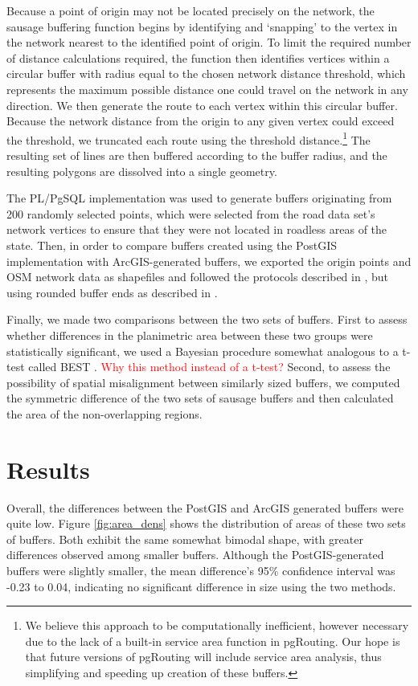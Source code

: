 \documentclass[11pt,letterpaper]{article} %
\begin{document}
Because a point of origin may not be located precisely on the network,
the sausage buffering function begins by identifying and `snapping' to the
vertex in the network nearest to the identified point of origin. To limit the
required number of distance calculations required, the function then
identifies vertices within a circular buffer with radius equal to the
chosen network distance threshold, which represents the maximum
possible distance one could travel on the network in any
direction. We then generate the route to each vertex within this
circular buffer. Because the network distance from the origin to any given vertex could exceed the threshold, we truncated each route using the threshold distance.\footnote{We
  believe this approach to be computationally inefficient, however
  necessary due to the lack of a built-in service area function in
  pgRouting. Our hope is that future versions of pgRouting will
  include service area analysis, thus simplifying and speeding up
  creation of these buffers.} The resulting set of lines are then
buffered according to the buffer radius, and the resulting polygons
are dissolved into a single geometry.

The PL/PgSQL implementation was used to generate buffers originating from 200 randomly
selected points, which were selected from the road data set's network vertices to ensure that they were not located in
roadless areas of the state. Then, in order to compare buffers
created using the PostGIS implementation with ArcGIS-generated buffers, we exported the origin points and OSM network data as shapefiles and followed the protocols described in
\textcite{Forsyth2012proto}, but using rounded buffer ends as described in \textcite{Forsyth2014sausage}. 

Finally, we made two comparisons between the two sets of
buffers. First to assess whether differences in
the planimetric area between these two groups were statistically significant, we
used a Bayesian procedure somewhat analogous to a t-test called BEST
\autocite{Kruschke2014,Kruschke2013}. \textcolor{red}{Why this method instead of a t-test?} Second, to assess the possibility of
spatial misalignment between similarly sized buffers, we computed the
symmetric difference of the two sets of sausage buffers and then
calculated the area of the non-overlapping regions.


\section*{Results}
Overall, the differences between the PostGIS and ArcGIS generated buffers were quite low. Figure
\ref{fig:area_dens} shows the distribution of areas of these two sets of
buffers. Both exhibit the same somewhat bimodal shape, with greater
differences observed among smaller buffers. Although the PostGIS-generated buffers were slightly smaller, the mean difference's 95\% confidence interval was -0.23 to 0.04, indicating no significant difference in size using the two methods.
\end{document}
